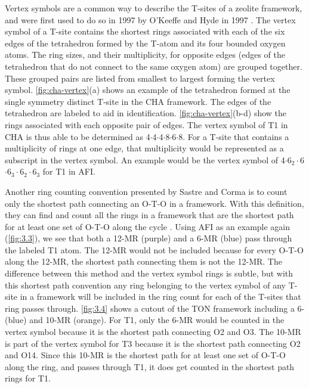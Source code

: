 \documentclass[11pt]{article}
\begin{document}
Vertex symbols are a common way to describe the T-sites of a zeolite framework, and were first used to do so in 1997 by O'Keeffe and Hyde in 1997 \cite{okeeffe-vertex-1997}. The vertex symbol of a T-site contains the shortest rings associated with each of the six edges of the tetrahedron formed by the T-atom and its four bounded oxygen atoms. The ring sizes, and  their multiplicity, for opposite edges (edges of the tetrahedron that do not connect to the same oxygen atom) are grouped together. These grouped pairs are listed from smallest to largest forming the vertex symbol. \cref{fig:cha-vertex}(a) shows an example of the tetrahedron formed at the single symmetry distinct T-site in the CHA framework. The edges of the tetrahedron are labeled to aid in identification. \cref{fig:cha-vertex}(b-d) show the rings associated with each opposite pair of edges. The vertex symbol of T1 in CHA is thus able to be determined as 4\(\cdot\)4\(\cdot\)4\(\cdot\)8\(\cdot\)6\(\cdot\)8. For a T-site that contains a multiplicity of rings at one edge, that multiplicity would be represented as a subscript in the vertex symbol. An example would be the vertex symbol of 4\(\cdot\)6\(_{\text{2}} \cdot\)6\(\cdot\)6\(_{\text{3}} \cdot\)6\(_{\text{2}} \cdot\)6\(_{\text{3}}\) for T1 in AFI. 

Another ring counting convention presented by Sastre and Corma is to count only the shortest path connecting an O-T-O in a framework. With this definition, they can find and count all the rings in a framework that are the shortest path for at least one set of O-T-O along the cycle \cite{sastre-topological-2009}. Using AFI as an example again (\cref{fig:3.3}), we see that both a 12-MR (purple) and a 6-MR (blue) pass through the labeled T1 atom. The 12-MR would not be included because for every O-T-O along the 12-MR, the shortest path connecting them is not the 12-MR. The difference between this method and the vertex symbol rings is subtle, but with this shortest path convention any ring belonging to the vertex symbol of any T-site in a framework will be included in the ring count for each of the T-sites that ring passes through. \cref{fig:3.4} shows a cutout of the TON framework including a 6- (blue) and 10-MR (orange). For T1, only the 6-MR would be counted in the vertex symbol because it is the shortest path connecting O2 and O3. The 10-MR is part of the vertex symbol for T3 because it is the shortest path connecting O2 and O14. Since this 10-MR is the shortest path for at least one set of O-T-O along the ring, and passes through T1, it does get counted in the shortest path rings for T1. 
\end{document}
